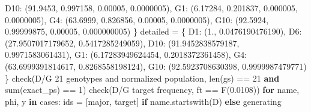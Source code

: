 \documentclass[
]{article}
\newenvironment{Shaded}{}{}
\newcommand{\BuiltInTok}[1]{\textcolor[rgb]{0.00,0.50,0.00}{#1}}
\newcommand{\ControlFlowTok}[1]{\textcolor[rgb]{0.00,0.44,0.13}{\textbf{#1}}}
\newcommand{\DecValTok}[1]{\textcolor[rgb]{0.25,0.63,0.44}{#1}}
\newcommand{\FloatTok}[1]{\textcolor[rgb]{0.25,0.63,0.44}{#1}}
\newcommand{\KeywordTok}[1]{\textcolor[rgb]{0.00,0.44,0.13}{\textbf{#1}}}
\newcommand{\NormalTok}[1]{#1}
\newcommand{\OperatorTok}[1]{\textcolor[rgb]{0.40,0.40,0.40}{#1}}
\newcommand{\StringTok}[1]{\textcolor[rgb]{0.25,0.44,0.63}{#1}}
\begin{document}
\begin{Shaded}
\begin{Highlighting}[]
        \StringTok{\textquotesingle{}D10\textquotesingle{}}\NormalTok{: (}\FloatTok{91.9453}\NormalTok{, }\FloatTok{0.997158}\NormalTok{, }\FloatTok{0.00005}\NormalTok{, }\FloatTok{0.0000005}\NormalTok{),}
        \StringTok{\textquotesingle{}G1\textquotesingle{}}\NormalTok{: (}\FloatTok{6.17284}\NormalTok{, }\FloatTok{0.201837}\NormalTok{, }\FloatTok{0.000005}\NormalTok{, }\FloatTok{0.0000005}\NormalTok{),}
        \StringTok{\textquotesingle{}G4\textquotesingle{}}\NormalTok{: (}\FloatTok{63.6999}\NormalTok{, }\FloatTok{0.826856}\NormalTok{, }\FloatTok{0.00005}\NormalTok{, }\FloatTok{0.0000005}\NormalTok{),}
        \StringTok{\textquotesingle{}G10\textquotesingle{}}\NormalTok{: (}\FloatTok{92.5924}\NormalTok{, }\FloatTok{0.99999875}\NormalTok{, }\FloatTok{0.00005}\NormalTok{, }\FloatTok{0.000000005}\NormalTok{)}
\NormalTok{    \}}
\NormalTok{    detailed }\OperatorTok{=}\NormalTok{ \{}
        \StringTok{\textquotesingle{}D1\textquotesingle{}}\NormalTok{: (}\FloatTok{1.}\NormalTok{, }\FloatTok{0.0476190476190}\NormalTok{),}
        \StringTok{\textquotesingle{}D6\textquotesingle{}}\NormalTok{: (}\FloatTok{27.9507017179652}\NormalTok{, }\FloatTok{0.5417285249059}\NormalTok{),}
        \StringTok{\textquotesingle{}D10\textquotesingle{}}\NormalTok{: (}\FloatTok{91.9452838579187}\NormalTok{, }\FloatTok{0.9971583061431}\NormalTok{),}
        \StringTok{\textquotesingle{}G1\textquotesingle{}}\NormalTok{: (}\FloatTok{6.17283949624454}\NormalTok{, }\FloatTok{0.2018372361458}\NormalTok{),}
        \StringTok{\textquotesingle{}G4\textquotesingle{}}\NormalTok{: (}\FloatTok{63.6999391814617}\NormalTok{, }\FloatTok{0.8268558198124}\NormalTok{),}
        \StringTok{\textquotesingle{}G10\textquotesingle{}}\NormalTok{: (}\FloatTok{92.5923708630398}\NormalTok{, }\FloatTok{0.9999987479771}\NormalTok{)}
\NormalTok{    \}}
\NormalTok{    check(}\StringTok{\textquotesingle{}D/G 21 genotypes and normalized population\textquotesingle{}}\NormalTok{,}
          \BuiltInTok{len}\NormalTok{(gs) }\OperatorTok{==} \DecValTok{21} \KeywordTok{and} \BuiltInTok{sum}\NormalTok{(exact\_ps) }\OperatorTok{==} \DecValTok{1}\NormalTok{)}
\NormalTok{    check(}\StringTok{\textquotesingle{}D/G target frequency\textquotesingle{}}\NormalTok{, ft }\OperatorTok{==}\NormalTok{ F(}\StringTok{\textquotesingle{}0.0108\textquotesingle{}}\NormalTok{))}
    \ControlFlowTok{for}\NormalTok{ name, phi, y }\KeywordTok{in}\NormalTok{ cases:}
\NormalTok{        ids }\OperatorTok{=}\NormalTok{ [major, target] }\ControlFlowTok{if}\NormalTok{ name.startswith(}\StringTok{\textquotesingle{}D\textquotesingle{}}\NormalTok{) }\ControlFlowTok{else}\NormalTok{ generating}

\end{Highlighting}
\end{Shaded}
\end{document}
